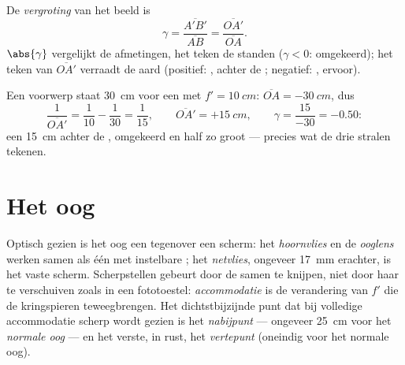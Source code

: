 \begin{definition}[Vergroting]\label{def:g11:lenses-and-eye:magnification}
De \emph{vergroting} van het beeld is
\[
\gamma = \frac{\overline{A'B'}}{\overline{AB}}
       = \frac{\overline{OA'}}{\overline{OA}} .
\]
$\abs{\gamma}$ vergelijkt de afmetingen, het teken de standen
($\gamma < 0$: omgekeerd); het teken van $\overline{OA'}$ verraadt de
aard (positief: , achter de ; negatief: , ervoor).
\end{definition}

\begin{example}\label{ex:g11:lenses-and-eye:conjugate}
Een voorwerp staat \qty{30}{cm} voor een  met
$f' = \qty{10}{cm}$: $\overline{OA} = \qty{-30}{cm}$, dus
\[
\frac{1}{\overline{OA'}} = \frac{1}{10} - \frac{1}{30} = \frac{1}{15},
\qquad \overline{OA'} = +\qty{15}{cm},
\qquad \gamma = \frac{15}{-30} = -0.50 :
\]
een  \qty{15}{cm} achter de , omgekeerd en half zo groot
--- precies wat de drie stralen tekenen.
\end{example}

\section{Het oog}

\begin{definition}\label{def:g11:lenses-and-eye:eye}
Optisch gezien is het oog een  tegenover een scherm:
het \emph{hoornvlies} en de \emph{ooglens}
werken samen als één  met instelbare
; het \emph{netvlies}, ongeveer
\qty{17}{mm} erachter, is het vaste scherm. Scherpstellen gebeurt door de
 samen te knijpen, niet door haar te verschuiven zoals in een
fototoestel: \emph{accommodatie} is de verandering
van $f'$ die de kringspieren teweegbrengen. Het dichtstbijzijnde punt dat
bij volledige accommodatie scherp wordt gezien is het
\emph{nabijpunt} --- ongeveer \qty{25}{cm} voor het
\emph{normale oog} --- en het verste, in rust, het
\emph{vertepunt} (oneindig voor het normale oog).
\end{definition}

